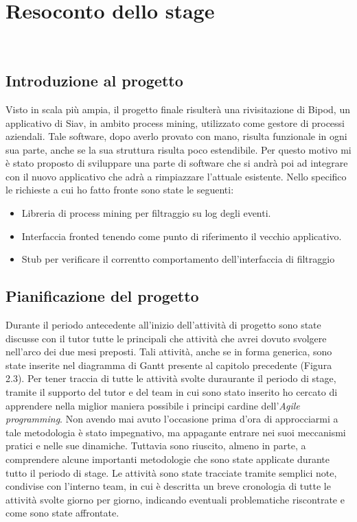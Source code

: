
\chapter{Resoconto dello stage}
\label{cap:descrizione-stage}

\\

\section{Introduzione al progetto}
Visto in scala più ampia, il progetto finale risulterà una rivisitazione di Bipod, un applicativo di Siav, in ambito process mining, utilizzato come gestore di processi aziendali.
Tale software, dopo averlo provato con mano, risulta funzionale in ogni sua parte, anche se la sua struttura risulta poco estendibile. Per questo motivo mi è stato proposto di sviluppare una parte di software che si andrà poi ad integrare con il nuovo applicativo che adrà a rimpiazzare l'attuale esistente.
Nello specifico le richieste a cui ho fatto fronte sono state le seguenti:
\begin{itemize}
	\item Libreria di process mining per filtraggio su log degli eventi.
	\item Interfaccia fronted tenendo come punto di riferimento il vecchio applicativo.
	\item Stub per verificare il correntto comportamento dell'interfaccia di filtraggio
\end{itemize}
\section{Pianificazione del progetto}
Durante il periodo antecedente all'inizio dell'attività di progetto sono state discusse con il tutor tutte le principali che attività che avrei dovuto svolgere nell'arco dei due mesi preposti. Tali attività, anche se in forma generica, sono state inserite nel diagramma di Gantt presente al capitolo precedente (Figura 2.3).
Per tener traccia di tutte le attività svolte duraurante il periodo di stage, tramite il supporto del tutor e del team in cui sono stato inserito ho cercato di apprendere nella miglior maniera possibile i principi cardine dell'\textit{Agile programming}. Non avendo mai avuto l'occasione prima d'ora di approcciarmi a tale metodologia è stato impegnativo, ma appagante entrare nei suoi meccanismi pratici e nelle sue dinamiche. Tuttavia sono riuscito, almeno in parte, a comprendere alcune importanti metodologie che sono state applicate durante tutto il periodo di stage. Le attività sono state tracciate tramite semplici note, condivise con l'interno team, in cui è descritta un breve cronologia di tutte le attività svolte giorno per giorno, indicando eventuali problematiche riscontrate e come sono state affrontate.

